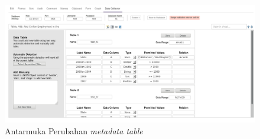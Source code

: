 \begin{figure}[htbp]
	\centering
	\includegraphics[width=1.0\textwidth]{resources/chapter-4-interface-3a.png}
	\caption{Antarmuka Perubahan \textit{metadata table}}
	\label{Antarmuka3}
\end{figure}

